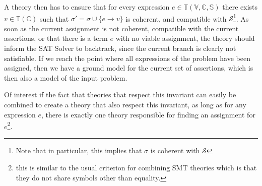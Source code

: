 A theory then has to ensure that for every expression $e \in \mathbb{T}(\mathbb{V,C,S})$
there exists $v \in \mathbb{T}(\mathbb{C})$ such that $\sigma' = \sigma \cup \{ e \rightarrow v \}$
is coherent, and compatible with $\mathcal{S}$\footnote{Note that in particular, this implies
that $\sigma$ is coherent with $\mathcal{S}$}. As soon as the current assignment is not coherent,
compatible with the current assertions, or that there is a term $e$ with no viable assignment, the theory
should inform the SAT Solver to backtrack, since the current branch is clearly not satisfiable.
If we reach the point where all expressions of the problem have been assigned, then we
have a ground model for the current set of assertions, which is then also a model
of the input problem.

Of interest if the fact that theories that respect this invariant can easily be combined
to create a theory that also respect this invariant, as long as for any expression $e$,
there is exactly one theory responsible for finding an assignment for $e$\footnote{this
is similar to the usual criterion for combining SMT theories which is that they do not
share symbols other than equality.}.

